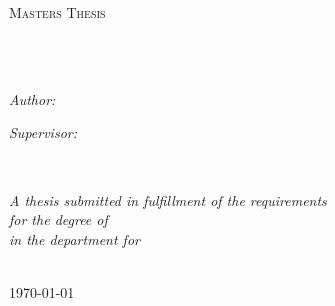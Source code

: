 \documentclass[
11pt, %
english, %
singlespacing, %
headsepline, %
]{MastersDoctoralThesis} %
\author{Alex Tripsas} %
\begin{document}
\frontmatter %

\pagestyle{plain} %


\begin{titlepage}
\begin{center}

\vspace*{.06\textheight}
{\scshape\LARGE \univname\par}\vspace{1.5cm} %
\textsc{\Large Masters Thesis}\\[0.5cm] %

\HRule \\[0.4cm] %
{\huge \bfseries \ttitle\par}\vspace{0.4cm} %
\HRule \\[1.5cm] %
 
\begin{minipage}[t]{0.4\textwidth}

\begin{flushleft} \large
\emph{Author:}\\
\href{http://www.johnsmith.com}{\authorname} %
\end{flushleft}
\end{minipage}
\begin{minipage}[t]{0.4\textwidth}
\begin{flushright} \large
\emph{Supervisor:} \\
\href{http://www.jamessmith.com}{\supname} %
\end{flushright}
\end{minipage}\\[3cm]
 
\vfill

\large \textit{A thesis submitted in fulfillment of the requirements\\ for the degree of \degreename}\\[0.3cm] %
\textit{in the department for}\\[0.4cm]
\deptname\\[2cm] %
 
\vfill

{\large \today}\\[4cm] %
 
\vfill
\end{center}
\end{titlepage}
\end{document}
